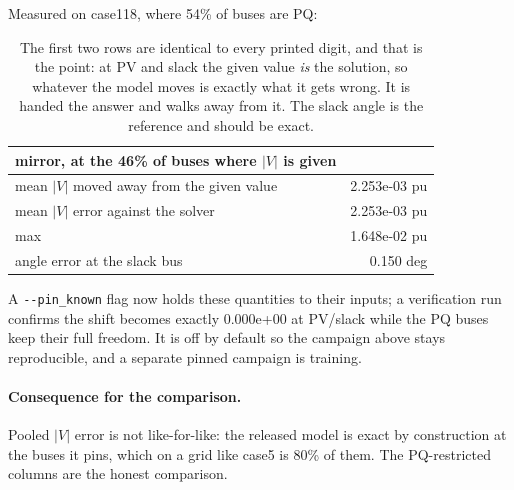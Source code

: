 \documentclass[10pt]{article}
\begin{document}
Measured on case118, where 54\% of buses are PQ:

\begin{table}[H]
\centering
\small
\begin{tabular}{lr}
\toprule
mirror, at the 46\% of buses where $|V|$ is given & \\
\midrule
mean $|V|$ moved away from the given value & 2.253e-03 pu \\
mean $|V|$ error against the solver        & 2.253e-03 pu \\
max                                        & 1.648e-02 pu \\
angle error at the slack bus               & 0.150 deg \\
\bottomrule
\end{tabular}
\caption{The first two rows are identical to every printed digit, and that is
the point: at PV and slack the given value \emph{is} the solution, so whatever
the model moves is exactly what it gets wrong. It is handed the answer and walks
away from it. The slack angle is the reference and should be exact.}
\end{table}

A \texttt{-{}-pin\_known} flag now holds these quantities to their inputs; a
verification run confirms the shift becomes exactly 0.000e+00 at PV/slack while
the PQ buses keep their full freedom. It is off by default so the campaign above
stays reproducible, and a separate pinned campaign is training.

\paragraph{Consequence for the comparison.} Pooled $|V|$ error is not
like-for-like: the released model is exact by construction at the buses it pins,
which on a grid like case5 is 80\% of them. The PQ-restricted columns are the
honest comparison.
\end{document}
